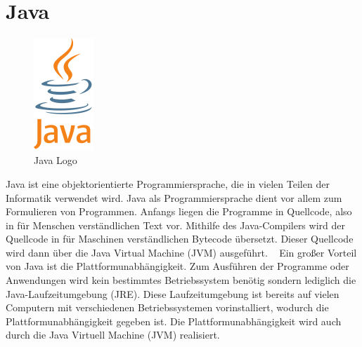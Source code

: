 \section{Java}
\begin{figure}
    \begin{center}
      \includegraphics[width=0.2\textwidth]{pics/Java_Logo.png}
      \caption{Java Logo ~\cite{java_logo}}
    \end{center}
\end{figure}
Java ist eine objektorientierte Programmiersprache, die in vielen Teilen der Informatik verwendet wird. 
Java als Programmiersprache dient vor allem zum Formulieren von Programmen. Anfangs liegen die Programme in 
Quellcode, also in für Menschen verständlichen Text vor. Mithilfe des Java-Compilers wird der Quellcode in für
Maschinen verständlichen Bytecode übersetzt. Dieser Quellcode wird dann über die Java Virtual Machine (JVM)
ausgeführt. ~\cite{java}
\newline
\newline
Ein großer Vorteil von Java ist die Plattformunabhängigkeit. Zum Ausführen der Programme oder Anwendungen
wird kein bestimmtes Betriebssystem benötig sondern lediglich die Java-Laufzeitumgebung (JRE).
Diese Laufzeitumgebung ist bereits auf vielen Computern mit verschiedenen Betriebssystemen vorinstalliert, 
wodurch die Plattformunabhängigkeit gegeben ist. Die Plattformunabhängigkeit wird auch durch die Java
Virtuell Machine (JVM) realisiert. ~\cite{java_biteno}
